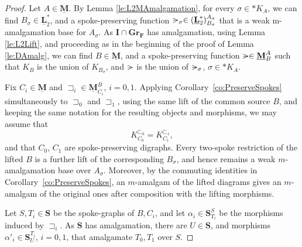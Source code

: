 \documentclass[12pt]{amsart}
\numberwithin{equation}{section}
\theoremstyle{plain}
\theoremstyle{definition}
\newcommand{\nil}{\mathrel{\vphantom{>}\text{\mathsurround=0pt\ooalign{$>$\cr$-$\cr}}}}
\newcommand \sqsp{\sqsupset}
\newcommand \sqsb{\sqsubset}
\newcommand \GGRFb{\mathbf{Gr_F}}
\newcommand \IIb{\mathbf{I}}
\newcommand \SSb{\mathbf{S}}
\newcommand \LLub{\underline{\mathbf{L}}}
\newcommand \MMub{\underline{\mathbf{M}}}
\begin{document}
\begin{proof}
Let $A \in \MMub$. By Lemma \ref{le:L2MAmalgamation}, for every $\sigma \in *K_A$, we can find $B_\sigma \in \LLub^*_2$, and a spoke-preserving function $\nil_\sigma \in (\LLub^*_2)^{A_\sigma}_{B_\sigma}$ that is a weak m-amalgamation base for $A_\sigma$. As $\IIb \cap \GGRFb$ has amalgamation, using Lemma \ref{le:L2Lift}, and proceeding as in the beginning of the proof of Lemma \ref{le:DAmalg}, we can find $B \in \MMub$, and a spoke-preserving function $\nil \in \MMub^A_B$ such that $K_B$ is the union of $K_{B_\sigma}$, and $\nil$ is the union of $\nil_\sigma$, $\sigma \in *K_A$.
	
Fix $C_i\in \MMub$ and  $\sqsp_i \in \MMub^B_{C_i}$, $i=0,1$. Applying Corollary~\ref{co:PreserveSpokes} simultaneously to $\sqsp_0$ and $\sqsp_1$, using the same lift of the common source $B$, and keeping the same notation for the resulting objects and morphisms, we may assume that $$K_{C_0}^{\sqsb_0}=K_{C_1}^{\sqsb_1},$$ and that $C_0$, $C_1$ are spoke-preserving digraphs. Every two-spoke restriction of the lifted $B$ is a further lift of the corresponding $B_\sigma$, and hence remains a weak
$m$-amalgamation base over $A_\sigma$. Moreover, by the commuting
identities in Corollary~\ref{co:PreserveSpokes}, an $m$-amalgam of
the lifted diagrams gives an $m$-amalgam of the original ones after
composition with the lifting morphisms.

Let $S,T_i \in \SSb$ be the spoke-graphs of $B,C_i$, and let $\alpha_i \in \SSb^S_{T_i}$ be the morphisms induced by $\sqsp_i$.  As $\SSb$ has amalgamation, there are $U \in \SSb$, and morphisms $\alpha'_i \in  \SSb^{T_i}_U$, $i=0,1$, that amalgamate $T_0, T_1$ over $S$.
	

\end{proof}
\end{document}
